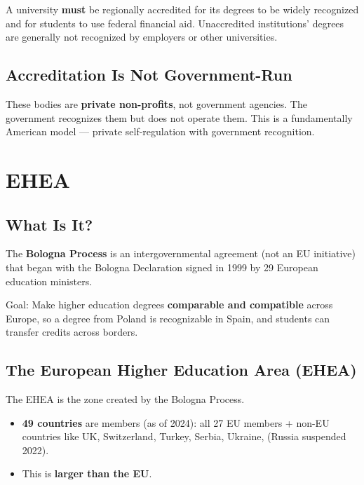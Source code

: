 A university \textbf{must} be regionally accredited for its degrees to be widely recognized and for students to use federal financial aid. Unaccredited institutions' degrees are generally not recognized by employers or other universities.

\section{Accreditation Is Not Government-Run}

These bodies are \textbf{private non-profits}, not government agencies. The government recognizes them but does not operate them. This is a fundamentally American model --- private self-regulation with government recognition.


\clearpage
{}



\chapter{EHEA}

\section{What Is It?}

The \textbf{Bologna Process} is an intergovernmental agreement (not an EU initiative) that began with the Bologna Declaration signed in 1999 by 29 European education ministers.

Goal: Make higher education degrees \textbf{comparable and compatible} across Europe, so a degree from Poland is recognizable in Spain, and students can transfer credits across borders.

\section{The European Higher Education Area (EHEA)}

The EHEA is the zone created by the Bologna Process.
\begin{itemize}
	\item \textbf{49 countries} are members (as of 2024): all 27 EU members + non-EU countries like UK, Switzerland, Turkey, Serbia, Ukraine, \etc (Russia suspended 2022).
	\item This is \textbf{larger than the EU}.
\end{itemize}

